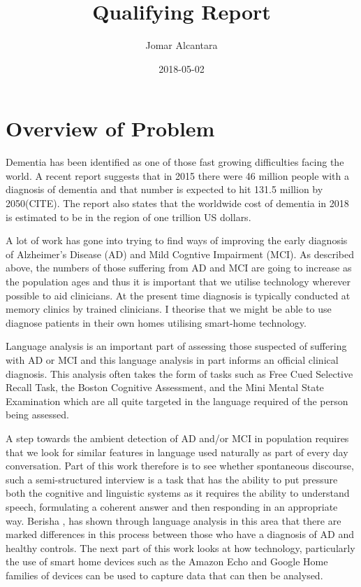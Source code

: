 \documentclass{article}
\title{Qualifying Report}
\date{2018-05-02}
\author{Jomar Alcantara}
\begin{document}
	\maketitle
	\newpage
	\section{Overview of Problem}
	Dementia has been identified as one of those fast growing difficulties facing the world. A recent report suggests that in 2015 there were 46 million people with a diagnosis of dementia and that number is expected to hit 131.5 million by 2050(CITE). The report also states that the worldwide cost of dementia in 2018 is estimated to be in the region of one trillion US dollars.
	\newline
	\par
	A lot of work has gone into trying to find ways of improving the early diagnosis of Alzheimer's Disease (AD) and Mild Cogntive Impairment (MCI). As described above, the numbers of those suffering from AD and MCI are going to increase as the population ages and thus it is important that we utilise technology wherever possible to aid clinicians. At the present time diagnosis is typically conducted at memory clinics by trained clinicians. I theorise that we might be able to use diagnose patients in their own homes utilising smart-home technology. 
	\newline
	\par
	Language analysis is an important part of assessing those suspected of suffering with AD or MCI and this language analysis in part informs an official clinical diagnosis. This analysis often takes the form of tasks such as Free Cued Selective Recall Task, the Boston Cognitive Assessment, and the Mini Mental State Examination which are all quite targeted in the language required of the person being assessed. 
	\newline
	\par
	A step towards the ambient detection of AD and/or MCI in population requires that we look for similar features in language used naturally as part of every day conversation. Part of this work therefore is to see whether spontaneous discourse, such a semi-structured interview is a task that has the ability to put pressure both the cognitive and linguistic systems as it requires the ability to understand speech, formulating a coherent answer and then responding in an appropriate way. Berisha \cite{Berisha2015}, has shown through language analysis in this area that there are marked differences in this process between those who have a diagnosis of AD and healthy controls. The next part of this work looks at how technology, particularly the use of smart home devices such as the Amazon Echo and Google Home families of devices can be used to capture data that can then be analysed.
\end{document}

